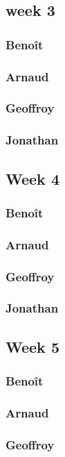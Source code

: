 \subsection*{week 3}
\subsubsection*{Benoît}
\subsubsection*{Arnaud}
\subsubsection*{Geoffroy}
\subsubsection*{Jonathan}

\subsection*{Week 4}
\subsubsection*{Benoît}
\subsubsection*{Arnaud}
\subsubsection*{Geoffroy}
\subsubsection*{Jonathan}

\subsection*{Week 5}
\subsubsection*{Benoît}
\subsubsection*{Arnaud}
\subsubsection*{Geoffroy}
